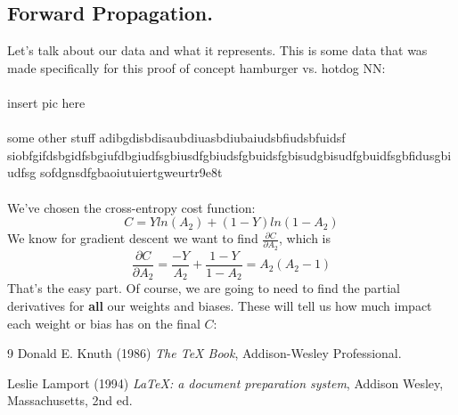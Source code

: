 \documentclass{article}
\begin{document}
    \subsection{Forward Propagation.}
    Let's talk about our data and what it represents. This is some data that was made specifically for this proof of concept hamburger vs. hotdog NN:\\\\
    insert pic here \\\\
    some other stuff adibgdisbdisaubdiuasbdiubaiudsbfiudsbfuidsf
    siobfgifdsbgidfsbgiufdbgiudfsgbiusdfgbiudsfgbuidsfgbisudgbisudfgbuidfsgbfidusgbiudfsg
    sofdgnsdfgbaoiutuiertgweurtr9e8t\\\\
    We've chosen the cross-entropy cost function:
    $$C = Yln(A_2)+(1-Y)ln(1-A_2)$$
    We know for gradient descent we want to find $\frac{\partial C}{\partial A_2}$, which is
    $$\frac{\partial C}{\partial A_2} = \frac{-Y}{A_2} + \frac{1-Y}{1-A_2} = A_2(A_2-1)$$
    That's the easy part. Of course, we are going to need to find the partial derivatives for \textbf{all} our weights and biases. These will tell us how much
    impact each weight or bias has on the final $C$:
    \begin{thebibliography}{9}
        Donald E. Knuth (1986) \emph{The \TeX{} Book}, Addison-Wesley Professional.
        
        Leslie Lamport (1994) \emph{\LaTeX: a document preparation system}, Addison
        Wesley, Massachusetts, 2nd ed.
        \end{thebibliography}
\end{document}
